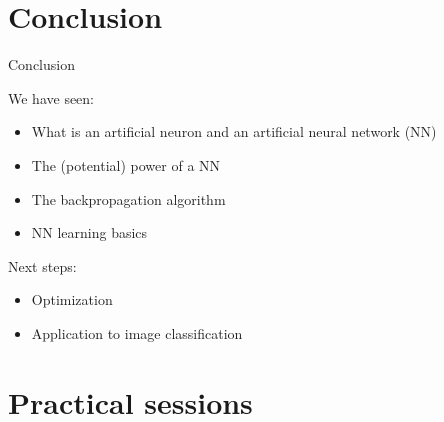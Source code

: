 \documentclass[xcolor=pdftex,dvipsnames,table,mathserif]{beamer}
\begin{document}


\section{Conclusion}


\begin{frame}{Conclusion}

  We have seen:
  \begin{itemize}
  \item What is an artificial neuron and an artificial neural network (NN)
  \item The (potential) power of a NN
  \item The backpropagation algorithm
  \item NN learning basics
  \end{itemize}

  Next steps:
  \begin{itemize}
  \item Optimization
  \item Application to image classification
  \end{itemize}


\end{frame}



\section*{Practical sessions}
\end{document}
